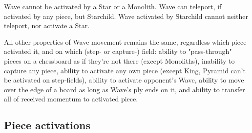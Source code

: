 Wave cannot be activated by a Star or a Monolith. Wave can teleport, if activated
by any piece, but Starchild. Wave activated by Starchild cannot neither teleport,
nor activate a Star.

All other properties of Wave movement remains the same, regardless which piece
activated it, and on which (step- or capture-) field: ability to "pass-through"
pieces on a chessboard as if they're not there (except Monoliths), inability to
capture any piece, ability to activate any own piece (except King, Pyramid can't
be activated on step-fields), ability to activate opponent's Wave, ability to move
over the edge of a board as long as Wave's ply ends on it, and ability to transfer
all of received momentum to activated piece.

\clearpage %

\subsection*{Piece activations}
\label{sec:Appendix/Summary/Piece activations}

